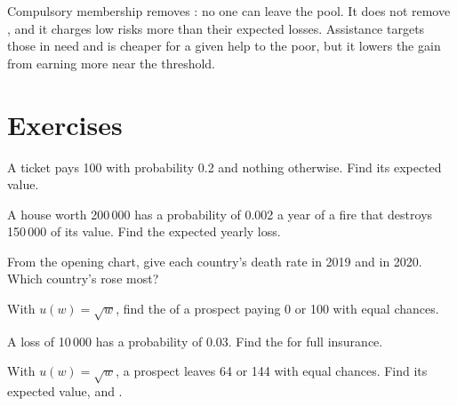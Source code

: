 Compulsory membership removes : no one can leave the pool. It does not remove , and it charges low risks more than their expected losses.
Assistance targets those in need and is cheaper for a given help to the poor, but it lowers the gain from earning more near the threshold.

\section{Exercises}

\begin{exercise}[$\star$]\label{exo:g12:risk-and-insurance:1}
A ticket pays 100 with probability 0.2 and nothing otherwise. Find its expected value.
\end{exercise}

\begin{exercise}[$\star$]\label{exo:g12:risk-and-insurance:2}
A house worth 200\,000 has a probability of 0.002 a year of a fire that destroys 150\,000 of its value. Find the expected yearly loss.
\end{exercise}

\begin{exercise}[$\star$]\label{exo:g12:risk-and-insurance:3}
From the opening chart, give each country's death rate in 2019 and in 2020. Which country's rose most?
\end{exercise}

\begin{exercise}[$\star$]\label{exo:g12:risk-and-insurance:4}
With $u(w) = \sqrt{w}$, find the  of a prospect paying 0 or 100 with equal chances.
\end{exercise}

\begin{exercise}[$\star$]\label{exo:g12:risk-and-insurance:5}
A loss of 10\,000 has a probability of 0.03. Find the  for full insurance.
\end{exercise}

\begin{exercise}[$\star\star$]\label{exo:g12:risk-and-insurance:6}
With $u(w) = \sqrt{w}$, a prospect leaves  64 or 144 with equal chances. Find its expected value,  and .
\end{exercise}

